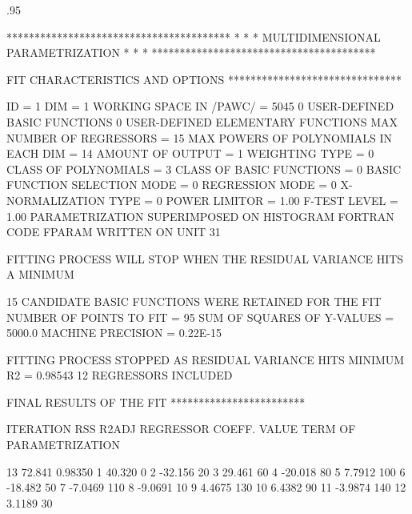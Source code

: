 \begin{Listing}
{\scriptsize\baselineskip.95\baselineskip\relax

 ****************************************
 *                                      *
 *   MULTIDIMENSIONAL PARAMETRIZATION   *
 *                                      *
 ****************************************

 FIT CHARACTERISTICS AND OPTIONS
 *******************************

 ID =   1
 DIM =  1
 WORKING SPACE IN /PAWC/ =    5045
  0 USER-DEFINED BASIC FUNCTIONS
  0 USER-DEFINED ELEMENTARY FUNCTIONS
 MAX NUMBER OF REGRESSORS = 15
 MAX POWERS OF POLYNOMIALS IN  EACH DIM = 14  
 AMOUNT OF OUTPUT = 1
 WEIGHTING TYPE = 0
 CLASS OF POLYNOMIALS = 3
 CLASS OF BASIC FUNCTIONS = 0
 BASIC FUNCTION SELECTION MODE = 0
 REGRESSION MODE = 0
 X-NORMALIZATION TYPE = 0
 POWER LIMITOR =  1.00
 F-TEST LEVEL =   1.00
 PARAMETRIZATION SUPERIMPOSED ON HISTOGRAM
 FORTRAN CODE FPARAM WRITTEN ON UNIT 31

 FITTING PROCESS WILL STOP WHEN THE RESIDUAL VARIANCE HITS A MINIMUM

  15 CANDIDATE BASIC FUNCTIONS WERE RETAINED FOR THE FIT
 NUMBER OF POINTS TO FIT =    95
 SUM OF SQUARES OF Y-VALUES =   5000.0    
 MACHINE PRECISION =  0.22E-15


 FITTING PROCESS STOPPED AS RESIDUAL VARIANCE HITS MINIMUM
 R2 =  0.98543      12 REGRESSORS INCLUDED

 FINAL RESULTS OF THE FIT
 ************************

 ITERATION       RSS       R2ADJ     REGRESSOR  COEFF. VALUE   TERM OF PARAMETRIZATION

    13        72.841       0.98350       1        40.320         0 
                                         2       -32.156        20 
                                         3        29.461        60 
                                         4       -20.018        80 
                                         5        7.7912       100 
                                         6       -18.482        50 
                                         7       -7.0469       110 
                                         8       -9.0691        10 
                                         9        4.4675       130 
                                        10        6.4382        90 
                                        11       -3.9874       140 
                                        12        3.1189        30 

\finalnewpage%

}
\end{Listing}
